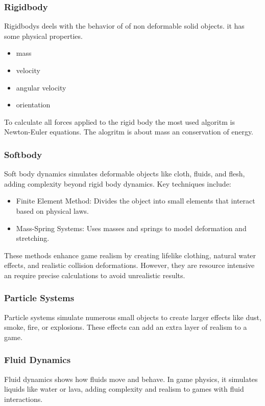 \documentclass{projdoc}
\begin{document}
\subsubsection{Rigidbody}
Rigidbodys deels with the behavior of of non deformable solid objects. it has some physical properties.
\begin{itemize}
	\item mass
	\item velocity
	\item angular velocity
	\item orientation
\end{itemize}
To calculate all forces applied to the rigid body the most used algoritm is Newton-Euler equations. The alogritm is about mass an conservation of energy.

\subsubsection{Softbody}
Soft body dynamics simulates deformable objects like cloth, fluids, and flesh, adding complexity beyond rigid body dynamics. Key techniques include:
\begin{itemize}
	\item Finite Element Method: Divides the object into small elements that interact based on physical laws.
	\item Mass-Spring Systems: Uses masses and springs to model deformation and stretching.
\end{itemize}
These methods enhance game realism by creating lifelike clothing, natural water effects, and realistic collision deformations. However, they are resource intensive an require precise calculations to avoid unrealistic results.

\subsubsection{Particle Systems}
Particle systems simulate numerous small objects to create larger effects like dust, smoke, fire, or explosions. These effects can add an extra layer of realism to a game.

\subsubsection{Fluid Dynamics}
Fluid dynamics shows how fluids move and behave. In game physics, it simulates liquids like water or lava, adding complexity and realism to games with fluid interactions.
\end{document}
